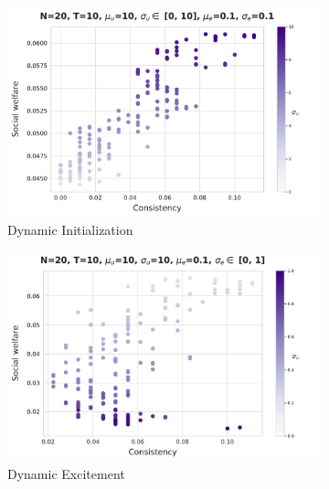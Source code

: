 \begin{figure}
    \centering
        \begin{subfigure}[b]{0.49\textwidth}
         \centering
         \includegraphics[width=\textwidth]{figures/mpda_dynamics_initliazation.pdf}
         \caption{Dynamic Initialization}
         \label{fig:init}
        \end{subfigure}
         \begin{subfigure}[b]{0.49\textwidth}
         \centering
         \includegraphics[width=\textwidth]{figures/mpda_dynamics_excitement_std.pdf}
         \caption{Dynamic Excitement}
         \label{fig:excite_std}
     \end{subfigure}
         \begin{subfigure}[b]{0.49\textwidth}
         \centering

\end{subfigure}
\end{figure}
